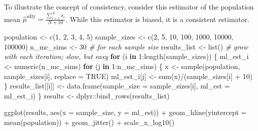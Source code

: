 \documentclass[
]{book}
\newenvironment{Shaded}{\begin{snugshade}}{\end{snugshade}}
\newcommand{\AttributeTok}[1]{\textcolor[rgb]{0.77,0.63,0.00}{#1}}
\newcommand{\CommentTok}[1]{\textcolor[rgb]{0.56,0.35,0.01}{\textit{#1}}}
\newcommand{\ConstantTok}[1]{\textcolor[rgb]{0.00,0.00,0.00}{#1}}
\newcommand{\ControlFlowTok}[1]{\textcolor[rgb]{0.13,0.29,0.53}{\textbf{#1}}}
\newcommand{\DecValTok}[1]{\textcolor[rgb]{0.00,0.00,0.81}{#1}}
\newcommand{\FunctionTok}[1]{\textcolor[rgb]{0.00,0.00,0.00}{#1}}
\newcommand{\NormalTok}[1]{#1}
\newcommand{\OtherTok}[1]{\textcolor[rgb]{0.56,0.35,0.01}{#1}}
\newcommand{\SpecialCharTok}[1]{\textcolor[rgb]{0.00,0.00,0.00}{#1}}
\begin{document}
To illustrate the concept of consistency, consider this estimator of the population mean \(\hat{\mu}^{\text{silly}} = \frac{\sum_{i = 1}^N x_i}{N + 10}\). While this estimator is biased, it is a consistent estimator.

\begin{Shaded}
\begin{Highlighting}[]
\NormalTok{population }\OtherTok{\textless{}{-}} \FunctionTok{c}\NormalTok{(}\DecValTok{1}\NormalTok{, }\DecValTok{2}\NormalTok{, }\DecValTok{3}\NormalTok{, }\DecValTok{4}\NormalTok{, }\DecValTok{5}\NormalTok{)}
\NormalTok{sample\_sizes }\OtherTok{\textless{}{-}} \FunctionTok{c}\NormalTok{(}\DecValTok{2}\NormalTok{, }\DecValTok{5}\NormalTok{, }\DecValTok{10}\NormalTok{, }\DecValTok{100}\NormalTok{, }\DecValTok{1000}\NormalTok{, }\DecValTok{10000}\NormalTok{, }\DecValTok{100000}\NormalTok{)}
\NormalTok{n\_mc\_sims }\OtherTok{\textless{}{-}} \DecValTok{30}  \CommentTok{\# for each sample size}
\NormalTok{results\_list }\OtherTok{\textless{}{-}} \FunctionTok{list}\NormalTok{()  }\CommentTok{\# grow with each iteration; slow, but easy}
\ControlFlowTok{for}\NormalTok{ (i }\ControlFlowTok{in} \DecValTok{1}\SpecialCharTok{:}\FunctionTok{length}\NormalTok{(sample\_sizes)) \{}
\NormalTok{  ml\_est\_i }\OtherTok{\textless{}{-}} \FunctionTok{numeric}\NormalTok{(n\_mc\_sims)}
  \ControlFlowTok{for}\NormalTok{ (j }\ControlFlowTok{in} \DecValTok{1}\SpecialCharTok{:}\NormalTok{n\_mc\_sims) \{}
\NormalTok{    x }\OtherTok{\textless{}{-}} \FunctionTok{sample}\NormalTok{(population, sample\_sizes[i], }\AttributeTok{replace =} \ConstantTok{TRUE}\NormalTok{)}
\NormalTok{    ml\_est\_i[j] }\OtherTok{\textless{}{-}} \FunctionTok{sum}\NormalTok{(x)}\SpecialCharTok{/}\NormalTok{(sample\_sizes[i] }\SpecialCharTok{+} \DecValTok{10}\NormalTok{)}
\NormalTok{  \}}
\NormalTok{  results\_list[[i]] }\OtherTok{\textless{}{-}} \FunctionTok{data.frame}\NormalTok{(}\AttributeTok{sample\_size =}\NormalTok{ sample\_sizes[i],}
                             \AttributeTok{ml\_est =}\NormalTok{ ml\_est\_i)}
\NormalTok{\}}
\NormalTok{results }\OtherTok{\textless{}{-}}\NormalTok{ dplyr}\SpecialCharTok{::}\FunctionTok{bind\_rows}\NormalTok{(results\_list) }

\FunctionTok{ggplot}\NormalTok{(results, }\FunctionTok{aes}\NormalTok{(}\AttributeTok{x =}\NormalTok{ sample\_size, }\AttributeTok{y =}\NormalTok{ ml\_est)) }\SpecialCharTok{+} 
  \FunctionTok{geom\_hline}\NormalTok{(}\AttributeTok{yintercept =} \FunctionTok{mean}\NormalTok{(population)) }\SpecialCharTok{+} 
  \FunctionTok{geom\_jitter}\NormalTok{() }\SpecialCharTok{+} 
  \FunctionTok{scale\_x\_log10}\NormalTok{()}
\end{Highlighting}
\end{Shaded}
\end{document}
